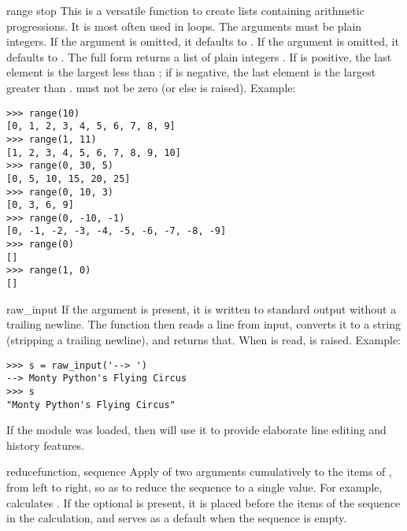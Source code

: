 \begin{funcdesc}{range}{ stop}
  This is a versatile function to create lists containing arithmetic
  progressions.  It is most often used in  loops.  The
  arguments must be plain integers.  If the  argument is
  omitted, it defaults to .  If the  argument is
  omitted, it defaults to .  The full form returns a list of
  plain integers .  If  is positive,
  the last element is the largest  less than ; if  is negative, the last
  element is the largest 
  greater than .   must not be zero (or else
   is raised).  Example:

\begin{verbatim}
>>> range(10)
[0, 1, 2, 3, 4, 5, 6, 7, 8, 9]
>>> range(1, 11)
[1, 2, 3, 4, 5, 6, 7, 8, 9, 10]
>>> range(0, 30, 5)
[0, 5, 10, 15, 20, 25]
>>> range(0, 10, 3)
[0, 3, 6, 9]
>>> range(0, -10, -1)
[0, -1, -2, -3, -4, -5, -6, -7, -8, -9]
>>> range(0)
[]
>>> range(1, 0)
[]
\end{verbatim}
\end{funcdesc}

\begin{funcdesc}{raw_input}{}
  If the  argument is present, it is written to standard output
  without a trailing newline.  The function then reads a line from input,
  converts it to a string (stripping a trailing newline), and returns that.
  When \EOF{} is read,  is raised. Example:

\begin{verbatim}
>>> s = raw_input('--> ')
--> Monty Python's Flying Circus
>>> s
"Monty Python's Flying Circus"
\end{verbatim}

  If the  module was loaded, then
   will use it to provide elaborate
  line editing and history features.
\end{funcdesc}

\begin{funcdesc}{reduce}{function, sequence}
  Apply  of two arguments cumulatively to the items of
  , from left to right, so as to reduce the sequence to
  a single value.  For example,
   calculates
  .
  If the optional  is present, it is placed before
  the items of the sequence in the calculation, and serves as a
  default when the sequence is empty.
\end{funcdesc}

